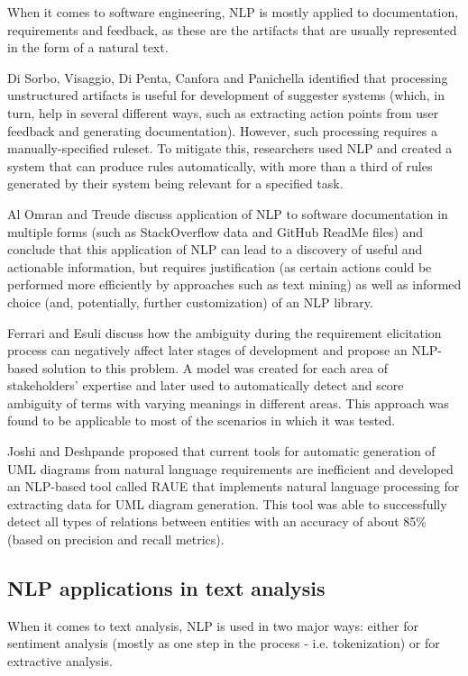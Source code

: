 When it comes to software engineering, NLP is mostly applied to documentation, requirements and feedback, as these are the artifacts that are usually represented in the form of a natural text.

Di Sorbo, Visaggio, Di Penta, Canfora and Panichella \cite{lr-1} identified that processing unstructured artifacts is useful for development of suggester systems (which, in turn, help in several different ways, such as extracting action points from user feedback and generating documentation). However, such processing requires a manually-specified ruleset. To mitigate this, researchers used NLP and created a system that can produce rules automatically, with more than a third of rules generated by their system being relevant for a specified task.

Al Omran and Treude \cite{lr-2} discuss application of NLP to software documentation in multiple forms (such as StackOverflow data and GitHub ReadMe files) and conclude that this application of NLP can lead to a discovery of useful and actionable information, but requires justification (as certain actions could be performed more efficiently by approaches such as text mining) as well as informed choice (and, potentially, further customization) of an NLP library.

Ferrari and Esuli \cite{lr-3} discuss how the ambiguity during the requirement elicitation process can negatively affect later stages of development and propose an NLP-based solution to this problem. A model was created for each area of stakeholders' expertise and later used to automatically detect and score ambiguity of terms with varying meanings in different areas. This approach was found to be applicable to most of the scenarios in which it was tested.

Joshi and Deshpande \cite{lr-4} proposed that current tools for automatic generation of UML diagrams from natural language requirements are inefficient and developed an NLP-based tool called RAUE that implements natural language processing for extracting data for UML diagram generation. This tool was able to successfully detect all types of relations between entities with an accuracy of about 85\% (based on precision and recall metrics).

\subsection{NLP applications in text analysis}

When it comes to text analysis, NLP is used in two major ways: either for sentiment analysis (mostly as one step in the process - i.e. tokenization) or for extractive analysis.

